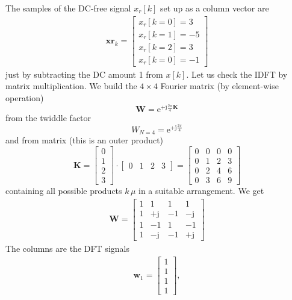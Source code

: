 \documentclass[11pt,a4paper,DIV=12]{scrartcl}
\begin{document}
\begin{Loesung}
\begin{enumerate}[label=\alph*)]
  The samples of the DC-free signal $x_r[k]$ set up as a column vector are
 \begin{align}
 \mathbf{xr}_{k} =
 \begin{bmatrix}
 x_r[k=0]=3\\x_r[k=1]=-5\\x_r[k=2]=3\\x_r[k=0]=-1
 \end{bmatrix}
 \end{align}
  just by subtracting the DC amount 1 from $x[k]$.
  Let us check the IDFT by matrix multiplication.
	We build the $4\times 4$ Fourier matrix (by element-wise operation)
	\begin{equation}
	\mathbf{W} = \mathrm{e}^{+\mathrm{j}\frac{2\pi}{4} \mathbf{K}}
	\end{equation}
	from the twiddle factor
	\begin{equation}
	W_{N=4} = \mathrm{e}^{+\mathrm{j}\frac{2\pi}{4}}
	\end{equation}
	and from matrix (this is an outer product)
	\begin{equation}
	\mathbf{K} =
	\begin{bmatrix}
	0\\
	1\\
	2\\
	3
	\end{bmatrix}
	\cdot
	\begin{bmatrix}
	0 & 1 & 2 & 3
	\end{bmatrix}
  =
	\begin{bmatrix}
	0 & 0 & 0 & 0\\
	0 & 1 & 2 & 3\\
	0 & 2 & 4 & 6\\
	0 & 3 & 6 & 9
	\end{bmatrix}
	\end{equation}
	containing all possible products $k\,\mu$ in a suitable arrangement.
	We get
	\begin{align}
	\mathbf{W} = \begin{bmatrix}
	1 & 1 & 1 & 1\\
	1 & +\mathrm{j} & -1 & -\mathrm{j}\\
	1 & -1 & 1 & -1\\
	1 & -\mathrm{j} & -1 & +\mathrm{j}
	\end{bmatrix}
  \end{align}
  The columns are the DFT signals
  \begin{align}
	\mathbf{w}_1 = \begin{bmatrix}1\\1\\1\\1\end{bmatrix},

\end{align}
\end{enumerate}
\end{Loesung}
\end{document}
